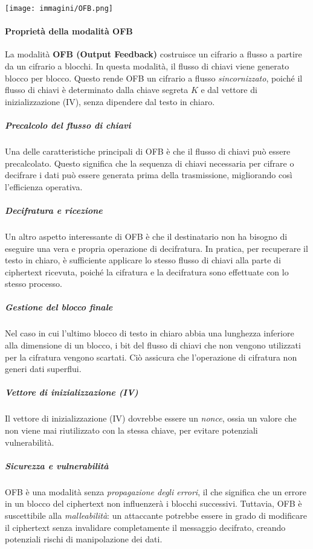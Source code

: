 \documentclass{report}
\begin{document}
\texttt{[image: immagini/OFB.png]}

\paragraph{Proprietà della modalità OFB}

La modalità \textbf{OFB (Output Feedback)} costruisce un cifrario a flusso a partire da un cifrario a blocchi. In questa modalità, il flusso di chiavi viene generato blocco per blocco. Questo rende OFB un cifrario a flusso \textit{sincornizzato}, poiché il flusso di chiavi è determinato dalla chiave segreta \(K\) e dal vettore di inizializzazione (IV), senza dipendere dal testo in chiaro.

\subparagraph{Precalcolo del flusso di chiavi}
Una delle caratteristiche principali di OFB è che il flusso di chiavi può essere precalcolato. Questo significa che la sequenza di chiavi necessaria per cifrare o decifrare i dati può essere generata prima della trasmissione, migliorando così l'efficienza operativa.

\subparagraph{Decifratura e ricezione}
Un altro aspetto interessante di OFB è che il destinatario non ha bisogno di eseguire una vera e propria operazione di decifratura. In pratica, per recuperare il testo in chiaro, è sufficiente applicare lo stesso flusso di chiavi alla parte di ciphertext ricevuta, poiché la cifratura e la decifratura sono effettuate con lo stesso processo.

\subparagraph{Gestione del blocco finale}
Nel caso in cui l'ultimo blocco di testo in chiaro abbia una lunghezza inferiore alla dimensione di un blocco, i bit del flusso di chiavi che non vengono utilizzati per la cifratura vengono scartati. Ciò assicura che l’operazione di cifratura non generi dati superflui.

\subparagraph{Vettore di inizializzazione (IV)}
Il vettore di inizializzazione (IV) dovrebbe essere un \textit{nonce}, ossia un valore che non viene mai riutilizzato con la stessa chiave, per evitare potenziali vulnerabilità.

\subparagraph{Sicurezza e vulnerabilità}
OFB è una modalità senza \textit{propagazione degli errori}, il che significa che un errore in un blocco del ciphertext non influenzerà i blocchi successivi. Tuttavia, OFB è suscettibile alla \textit{malleabilità}: un attaccante potrebbe essere in grado di modificare il ciphertext senza invalidare completamente il messaggio decifrato, creando potenziali rischi di manipolazione dei dati.
\end{document}
